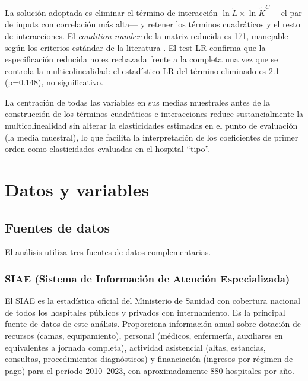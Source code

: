 \documentclass[12pt, a4paper, twoside, openright]{book}
\theoremstyle{plain}
\theoremstyle{definition}
\theoremstyle{remark}
\begin{document}
La solución adoptada es eliminar el término de interacción $\ln\tilde{L}\times\ln\tilde{K}^C$ ---el par de inputs con correlación más alta--- y retener los términos cuadráticos y el resto de interacciones. El \textit{condition number} de la matriz reducida es 171, manejable según los criterios estándar de la literatura \citep{kumbhakar2000}. El test LR confirma que la especificación reducida no es rechazada frente a la completa una vez que se controla la multicolinealidad: el estadístico LR del término eliminado es 2.1 (p=0.148), no significativo.

La centración de todas las variables en sus medias muestrales antes de la construcción de los términos cuadráticos e interacciones reduce sustancialmente la multicolinealidad sin alterar la elasticidades estimadas en el punto de evaluación (la media muestral), lo que facilita la interpretación de los coeficientes de primer orden como elasticidades evaluadas en el hospital ``tipo''.



\chapter{Datos y variables}
\label{ch:datos}

\section{Fuentes de datos}

El análisis utiliza tres fuentes de datos complementarias.

\subsection{SIAE (Sistema de Información de Atención Especializada)}

El SIAE es la estadística oficial del Ministerio de Sanidad con cobertura nacional de todos los hospitales públicos y privados con internamiento. Es la principal fuente de datos de este análisis. Proporciona información anual sobre dotación de recursos (camas, equipamiento), personal (médicos, enfermería, auxiliares en equivalentes a jornada completa), actividad asistencial (altas, estancias, consultas, procedimientos diagnósticos) y financiación (ingresos por régimen de pago) para el período 2010--2023, con aproximadamente 880 hospitales por año.
\end{document}
